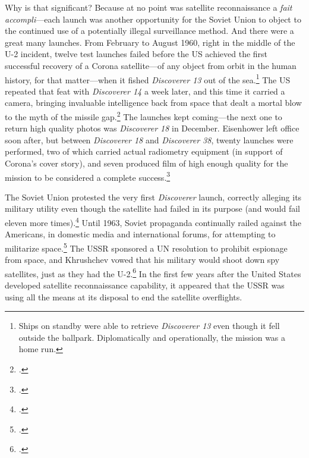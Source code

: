 \documentclass[14pt]{extarticle}
\begin{document}
Why is that significant? Because at no point was satellite reconnaissance a \emph{fait accompli}---each launch was another opportunity for the Soviet Union to object to the continued use of a potentially illegal surveillance method. And there were a great many launches. From February to August 1960, right in the middle of the U-2 incident, twelve test launches failed before the US achieved the first successful recovery of a Corona satellite---of any object from orbit in the human history, for that matter---when it fished \emph{Discoverer 13} out of the sea.\footnote{Ships on standby were able to retrieve \emph{Discoverer 13} even though it fell outside the ballpark. Diplomatically and operationally, the mission was a home run.} The US repeated that feat with \emph{Discoverer 14} a week later, and this time it carried a camera, bringing invaluable intelligence back from space that dealt a mortal blow to the myth of the missile gap.\footcite[p.~101-102. The previous launch failures had been so demoralizing that \emph{Discoverer 13} only carried diagnostic equipment, no cameras.]{lindgren_trust_2000} The launches kept coming---the next one to return high quality photos was \emph{Discoverer 18} in December. Eisenhower left office soon after, but between \emph{Discoverer 18} and \emph{Discoverer 38}, twenty launches were performed, two of which carried actual radiometry equipment (in support of Corona's cover story), and seven produced film of high enough quality for the mission to be considered a complete success.\footcite[p.~103]{lindgren_trust_2000}

The Soviet Union protested the very first \emph{Discoverer} launch, correctly alleging its military utility even though the satellite had failed in its purpose (and would fail eleven more times).\footcite[p.~140]{day_eye_2015} Until 1963, Soviet propaganda continually railed against the Americans, in domestic media and international forums, for attempting to militarize space.\footcite[p.~271]{mcdougall_heavens_1985} The USSR sponsored a UN resolution to prohibit espionage from space, and Khrushchev vowed that his military would shoot down spy satellites, just as they had the U-2.\footcite[p.~166]{day_eye_2015} In the first few years after the United States developed satellite reconnaissance capability, it appeared that the USSR was using all the means at its disposal to end the satellite overflights.
\end{document}
